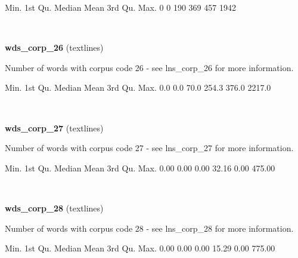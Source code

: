 \documentclass[]{article}
\newenvironment{Shaded}{\begin{snugshade}}{\end{snugshade}}
\newcommand{\DecValTok}[1]{\textcolor[rgb]{0.00,0.00,0.81}{{#1}}}
\newcommand{\FloatTok}[1]{\textcolor[rgb]{0.00,0.00,0.81}{{#1}}}
\newcommand{\NormalTok}[1]{{#1}}
\begin{document}
\begin{Shaded}
\begin{Highlighting}[]
   \NormalTok{Min. 1st Qu.  Median    Mean 3rd Qu.    Max. }
      \DecValTok{0}       \DecValTok{0}     \DecValTok{190}     \DecValTok{369}     \DecValTok{457}    \DecValTok{1942} 
\end{Highlighting}
\end{Shaded}

~

\vspace{1em}

\textbf{wds\_corp\_26} (textlines)

Number of words with corpus code 26 - see lns\_corp\_26 for more
information.

\begin{Shaded}
\begin{Highlighting}[]
   \NormalTok{Min. 1st Qu.  Median    Mean 3rd Qu.    Max. }
    \FloatTok{0.0}     \FloatTok{0.0}    \FloatTok{70.0}   \FloatTok{254.3}   \FloatTok{376.0}  \FloatTok{2217.0} 
\end{Highlighting}
\end{Shaded}

~

\vspace{1em}

\textbf{wds\_corp\_27} (textlines)

Number of words with corpus code 27 - see lns\_corp\_27 for more
information.

\begin{Shaded}
\begin{Highlighting}[]
   \NormalTok{Min. 1st Qu.  Median    Mean 3rd Qu.    Max. }
   \FloatTok{0.00}    \FloatTok{0.00}    \FloatTok{0.00}   \FloatTok{32.16}    \FloatTok{0.00}  \FloatTok{475.00} 
\end{Highlighting}
\end{Shaded}

~

\vspace{1em}

\textbf{wds\_corp\_28} (textlines)

Number of words with corpus code 28 - see lns\_corp\_28 for more
information.

\begin{Shaded}
\begin{Highlighting}[]
   \NormalTok{Min. 1st Qu.  Median    Mean 3rd Qu.    Max. }
   \FloatTok{0.00}    \FloatTok{0.00}    \FloatTok{0.00}   \FloatTok{15.29}    \FloatTok{0.00}  \FloatTok{775.00} 
\end{Highlighting}
\end{Shaded}
\end{document}
